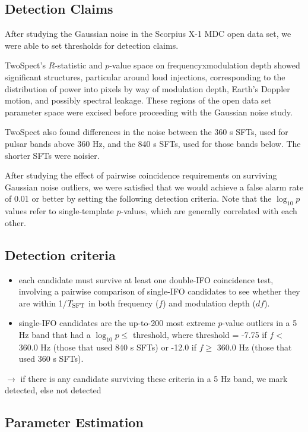 \subsection{Detection Claims}

After studying the Gaussian noise in the Scorpius X-1 MDC open data set, we were able to set thresholds for detection claims.

TwoSpect's $R$-statistic and $p$-value space on {frequency}x{modulation depth} showed significant structures, particular around loud injections, corresponding to the distribution of power into pixels by way of modulation depth, Earth's Doppler motion, and possibly spectral leakage. These regions of the open data set parameter space were excised before proceeding with the Gaussian noise study.

TwoSpect also found differences in the noise between the 360 s SFTs, used for pulsar bands above 360 Hz, and the 840 s SFTs, used for those bands below. The shorter SFTs were noisier.

After studying the effect of pairwise coincidence requirements on surviving Gaussian noise outliers, we were satisfied that we would achieve a false alarm rate of 0.01 or better by setting the following detection criteria. Note that the $\log_{10} p$ values refer to single-template $p$-values, which are generally correlated with each other.

\subsection{Detection criteria}

\begin{itemize}
\item each candidate must survive at least one double-IFO coincidence test, involving a pairwise comparison of single-IFO candidates to see whether they are within 1/$T_{\textup{SFT}}$ in both frequency ($f$) and modulation depth ($df$).
\item single-IFO candidates are the up-to-200 most extreme $p$-value outliers in a 5 Hz band that had a $\log_{10}p \leq$ threshold, where threshold = -7.75 if $f <$ 360.0 Hz (those that used 840 s SFTs) or -12.0 if $f \geq$ 360.0 Hz (those that used 360 s SFTs).
\end{itemize}

$\rightarrow$ if there is any candidate surviving these criteria in a 5 Hz band, we mark detected, else not detected

\subsection{Parameter Estimation}

